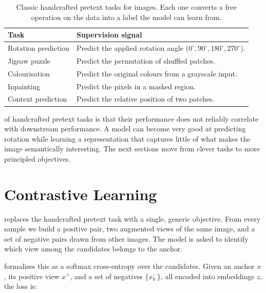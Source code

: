 \begin{table}[ht]
\centering
\begin{tabular}{p{}p{}}
    \toprule
    \textbf{Task} & \textbf{Supervision signal} \\
    \midrule
    Rotation prediction  & Predict the applied rotation angle ($0^\circ, 90^\circ, 180^\circ, 270^\circ$). \\
    Jigsaw puzzle        & Predict the permutation of shuffled patches. \\
    Colourisation        & Predict the original colours from a grayscale input. \\
    Inpainting           & Predict the pixels in a masked region. \\
    Context prediction   & Predict the relative position of two patches. \\
    \bottomrule
\end{tabular}
\vspace{2em}
\caption{Classic handcrafted pretext tasks for images. Each one converts a free operation on the data into a label the model can learn from.}
\label{tab:pretext_tasks}
\end{table}

 of handcrafted pretext tasks is that their performance does not reliably correlate with downstream performance. A model can become very good at predicting rotation while learning a representation that captures little of what makes the image semantically interesting. The next sections move from clever tasks to more principled objectives.


\section{Contrastive Learning}


 replaces the handcrafted pretext task with a single, generic objective. From every sample we build a positive pair, two augmented views of the same image, and a set of negative pairs drawn from other images. The model is asked to identify which view among the candidates belongs to the anchor.

 formalises this as a softmax cross-entropy over the candidates. Given an anchor $x$, its positive view $x^+$, and a set of negatives $\{x^-_k\}$, all encoded into embeddings $z$, the loss is:

